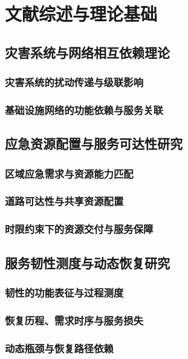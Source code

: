 \chapter{文献综述与理论基础}
\label{chap:literature}

\section{灾害系统与网络相互依赖理论}
\subsection{灾害系统的扰动传递与级联影响}
\subsection{基础设施网络的功能依赖与服务关联}

\ThesisBlank

\section{应急资源配置与服务可达性研究}
\subsection{区域应急需求与资源能力匹配}
\subsection{道路可达性与共享资源配置}
\subsection{时限约束下的资源交付与服务保障}

\ThesisBlank

\section{服务韧性测度与动态恢复研究}
\subsection{韧性的功能表征与过程测度}
\subsection{恢复历程、需求时序与服务损失}
\subsection{动态瓶颈与恢复路径依赖}

